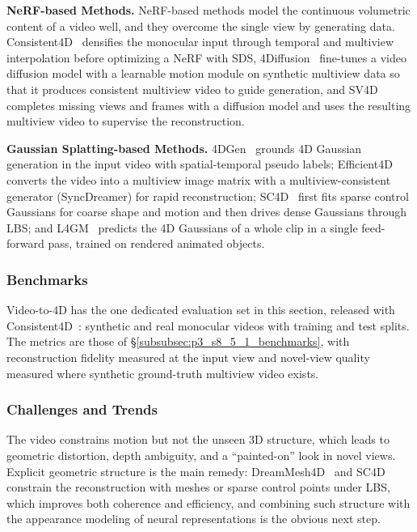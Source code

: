 \textbf{NeRF-based Methods.} NeRF-based methods model the continuous volumetric content of a video well, and they overcome the single view by generating data. Consistent4D~\cite{jiang2023consistent4d} densifies the monocular input through temporal and multiview interpolation before optimizing a NeRF with SDS, 4Diffusion~\cite{zhang20244diffusion} fine-tunes a video diffusion model with a learnable motion module on synthetic multiview data so that it produces consistent multiview video to guide generation, and SV4D~\cite{xie2024sv4d} completes missing views and frames with a diffusion model and uses the resulting multiview video to supervise the reconstruction.

\textbf{Gaussian Splatting-based Methods.} 4DGen~\cite{yin20234dgen} grounds 4D Gaussian generation in the input video with spatial-temporal pseudo labels; Efficient4D~\cite{pan2024efficient4d} converts the video into a multiview image matrix with a multiview-consistent generator (SyncDreamer) for rapid reconstruction; SC4D~\cite{wu2024sc4d} first fits sparse control Gaussians for coarse shape and motion and then drives dense Gaussians through LBS; and L4GM~\cite{ren2024l4gm} predicts the 4D Gaussians of a whole clip in a single feed-forward pass, trained on rendered animated objects.


\subsubsection{Benchmarks}
\label{subsubsec:p3_s8_5_3_benchmarks}
Video-to-4D has the one dedicated evaluation set in this section, released with Consistent4D~\cite{jiang2023consistent4d}: synthetic and real monocular videos with training and test splits. The metrics are those of §\ref{subsubsec:p3_s8_5_1_benchmarks}, with reconstruction fidelity measured at the input view and novel-view quality measured where synthetic ground-truth multiview video exists.

\subsubsection{Challenges and Trends}
\label{subsubsec:p3_s8_5_3_challenges}
The video constrains motion but not the unseen 3D structure, which leads to geometric distortion, depth ambiguity, and a ``painted-on'' look in novel views.
Explicit geometric structure is the main remedy: DreamMesh4D~\cite{li2024dreammesh4d} and SC4D~\cite{wu2024sc4d} constrain the reconstruction with meshes or sparse control points under LBS, which improves both coherence and efficiency, and combining such structure with the appearance modeling of neural representations is the obvious next step.

